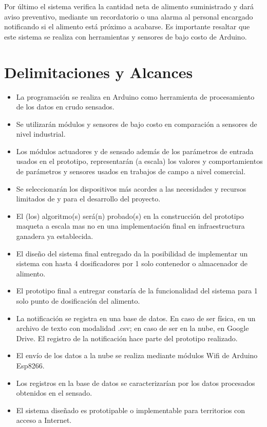 Por último el sistema verifica la cantidad neta de alimento suministrado y dará aviso preventivo, mediante un recordatorio o una alarma al personal encargado notificando si el alimento está próximo a acabarse.
Es importante resaltar que este sistema se realiza con herramientas y sensores de bajo costo de Arduino.\\





\section{Delimitaciones y Alcances} \label{limites}
\begin{itemize}
	\item La programación se realiza en Arduino como herramienta de procesamiento de los datos en crudo sensados.
	\item Se utilizarán módulos y sensores de bajo costo en comparación a sensores de nivel industrial.
	\item Los módulos actuadores y de sensado además de los parámetros de entrada usados en el prototipo, representarán (a escala) los valores y comportamientos de parámetros y sensores usados en trabajos de campo a nivel comercial. %
	\item Se seleccionarán los dispositivos más acordes a las necesidades y recursos limitados de y para el desarrollo del proyecto.
	\item El (los) algoritmo(s) será(n) probado(s) en la construcción del prototipo maqueta a escala mas no en una implementación final en infraestructura ganadera ya establecida.
	\item El diseño del sistema final entregado da la posibilidad de implementar un sistema con hasta 4 dosificadores por 1 solo contenedor o almacenador de alimento.
	\item El prototipo final a entregar constaría de la funcionalidad del sistema para 1 solo punto de dosificación del alimento.
	\item La notificaci\'on se registra en una base de datos. En caso de ser física, en un archivo de texto con modalidad .csv; en caso de ser en la nube, en Google Drive. El registro de la notificación hace parte del prototipo realizado.
	\item El envío de los datos a la nube se realiza mediante módulos Wifi de Arduino Esp8266.
	\item Los registros en la base de datos se caracterizar\'ian por los datos procesados obtenidos en el sensado.
	\item El sistema diseñado es prototipable o implementable para territorios con acceso a Internet.

\end{itemize}

